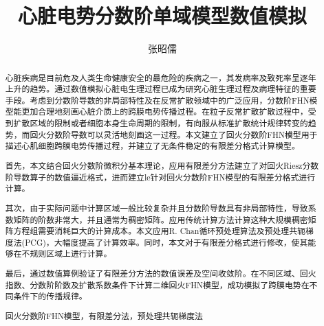 \documentclass[twoside,UTF8]{nputhesis}
\title[Numerical Simulation for the Fractional Monodomain Model of Cardiac Potential]{  心脏电势分数阶单域模型数值模拟}
\author[Zhaoru Zhang]{张昭儒}
\begin{document}
 


\makecover  %
\frontmatter
\begin{abstract}
心脏疾病是目前危及人类生命健康安全的最危险的疾病之一，其发病率及致死率呈逐年上升的趋势。通过数值模拟心脏电生理过程已成为研究心脏生理过程及病理特征的重要手段。考虑到分数阶导数的非局部特性及在反常扩散领域中的广泛应用，分数阶FHN模型能更加合理地刻画心脏介质上的跨膜电势传播过程。在粒子反常扩散扩散过程中，受到扩散区域的限制或者细胞本身生命周期的限制，有向服从标准扩散统计规律转变的趋势，而回火分数阶导数可以灵活地刻画这一过程。本文建立了回火分数阶FHN模型用于描述心肌细胞跨膜电势传播过程，并建立了无条件稳定的有限差分格式计算模型。

首先，本文结合回火分数阶微积分基本理论，应用有限差分方法建立了对回火Riesz分数阶导数算子的数值逼近格式，进而建立le针对回火分数阶FHN模型的有限差分格式进行计算。

其次，由于实际问题中计算区域一般比较复杂并且分数阶导数具有非局部特性，导致系数矩阵的阶数非常大，并且通常为稠密矩阵。应用传统计算方法计算这种大规模稠密矩阵方程组需要消耗巨大的计算成本。本文应用R. Chan循环预处理算法及预处理共轭梯度法(PCG)，大幅度提高了计算效率。同时，本文对于有限差分格式进行修改，使其能够在不规则区域上进行计算。

最后，通过数值算例验证了有限差分方法的数值误差及空间收敛阶。在不同区域、回火指数、分数阶阶数及扩散系数条件下计算二维回火FHN模型，成功模拟了跨膜电势在不同条件下的传播规律。
\noindent
\begin{keywords}
  回火分数阶FHN模型，有限差分法，预处理共轭梯度法
\end{keywords}
\end{abstract}
\end{document}
